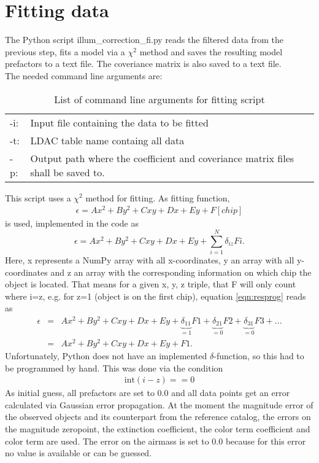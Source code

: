 \chapter{Fitting data}
\label{ch:IllumCorrectionFitting}
The Python script illum\_correction\_fi.py reads the filtered data from the previous step, fits a model via a $\chi^2$ method and saves the resulting model prefactors to a text file. The coveriance matrix is also saved to a text file.\\
The needed command line arguments are:
\begin{table}[H]
\centering
\begin{tabular}{lp{11.5cm}}
-i: & Input file containing the data to be fitted\\
-t: & LDAC table name containg all data\\
-p: & Output path where the coefficient and coveriance matrix files shall be saved to.\\
\end{tabular}
\caption{List of command line arguments for fitting script}
\label{tab:CommandLineArgumentsFittingScript}
\end{table}

This script uses a $\chi^2$ method for fitting. As fitting function, 
\begin{eqnarray}
\epsilon = Ax^{2} + By^{2} + Cxy + Dx + Ey + F\left[chip\right]\label{eqn:residual}
\end{eqnarray}
is used, implemented in the code as
\begin{equation}
\epsilon = Ax^{2} + By^{2} + Cxy + Dx + Ey + \sum_{i=1}^{N} \delta_{iz}Fi .
\label{eqn:resprog}
\end{equation}
Here, x represents a NumPy array with all x-coordinates, y an array with all y-coordinates and z an array with the corresponding information on which chip the object is located. That means for a given x, y, z triple, that F will only count where i=z, e.g. for z=1 (object is on the first chip), equation \ref{eqn:resprog} reads as
\begin{eqnarray}
\epsilon & = & Ax^{2} + By^{2} + Cxy + Dx + Ey + \underbrace{\delta_{11}}_{=1} F1 + \underbrace{\delta_{21}}_{=0} F2 + \underbrace{\delta_{31}}_{=0} F3 + ...\\
 & = & Ax^{2} + By^{2} + Cxy + Dx + Ey + F1 .
\end{eqnarray}
Unfortunately, Python does not have an implemented $\delta$-function, so this had to be programmed by hand. This was done via the condition
\begin{eqnarray}
\mathrm{int}\left(i-z\right) == 0
\end{eqnarray}
As initial guess, all prefactors are set to 0.0 and all data points get an error calculated via Gaussian error propagation. At the moment the magnitude error of the observed objects and its counterpart from the reference catalog, the errors on the magnitude zeropoint, the extinction coefficient, the color term coefficient and color term are used. The error on the airmass is set to 0.0 because for this error no value is available or can be guessed.
